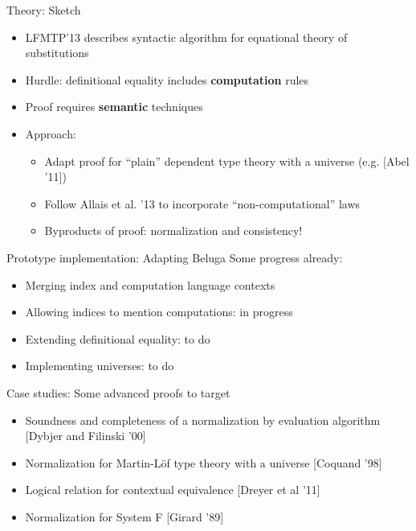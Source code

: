 \documentclass[usenames,dvipsnames]{beamer}
\begin{document}
\begin{frame}{Theory: Sketch}
\begin{itemize}
\item LFMTP'13 describes syntactic algorithm for equational theory of substitutions
\item Hurdle: definitional equality includes \textbf{computation} rules
\item Proof requires \textbf{semantic} techniques
\item Approach:
\begin{itemize}
\item Adapt proof for ``plain'' dependent type theory with a universe (e.g. [Abel '11])
\item Follow Allais et al. '13 to incorporate ``non-computational'' laws
\item Byproducts of proof: normalization and consistency!
\end{itemize}
\end{itemize}
\end{frame}

\begin{frame}{Prototype implementation: Adapting Beluga}
Some progress already:
\begin{itemize}
\item Merging index and computation language contexts \good
\item Allowing indices to mention computations: in progress
\item Extending definitional equality: to do
\item Implementing universes: to do
\end{itemize}
\end{frame}

\begin{frame}{Case studies: Some advanced proofs to target}
\begin{itemize}
\item Soundness and completeness of a normalization by evaluation algorithm [Dybjer and Filinski '00]
\item Normalization for Martin-L\"of type theory with a universe [Coquand '98]
\item Logical relation for contextual equivalence [Dreyer et al '11]
\item Normalization for System F [Girard '89]
\end{itemize}
\end{frame}
\end{document}
